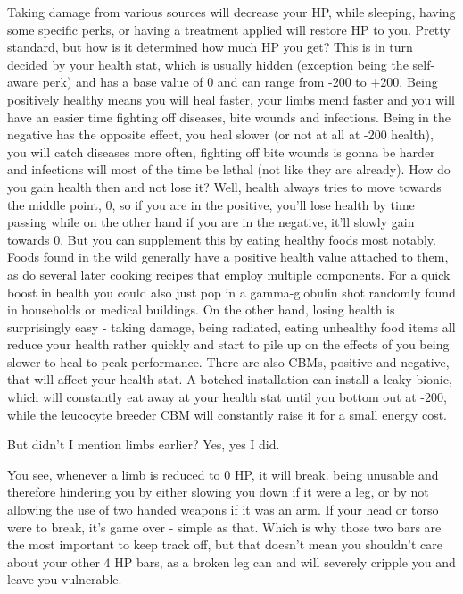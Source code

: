 \documentclass[11pt]{report}
\begin{document}
Taking damage from various sources will decrease your HP, while sleeping, having some specific perks, or having a treatment applied will restore HP to you. Pretty standard, but how is it determined how much HP you get? This is in turn decided by your health stat, which is usually hidden (exception being the self-aware perk) and has a base value of 0 and can range from -200 to +200. Being positively healthy means you will heal faster, your limbs mend faster and you will have an easier time fighting off diseases, bite wounds and infections. Being in the negative has the opposite effect, you heal slower (or not at all at -200 health), you will catch diseases more often, fighting off bite wounds is gonna be harder and infections will most of the time be lethal (not like they are already). How do you gain health then and not lose it? Well, health always tries to move towards the middle point, 0, so if you are in the positive, you'll lose health by time passing while on the other hand if you are in the negative, it'll slowly gain towards 0. But you can supplement this by eating healthy foods most notably. Foods found in the wild generally have a positive health value attached to them, as do several later cooking recipes that employ multiple components. For a quick boost in health you could also just pop in a gamma-globulin shot randomly found in households or medical buildings. On the other hand, losing health is surprisingly easy - taking damage, being radiated, eating unhealthy food items all reduce your health rather quickly and start to pile up on the effects of you being slower to heal to peak performance. There are also CBMs, positive and negative, that will affect your health stat. A botched installation can install a leaky bionic, which will constantly eat away at your health stat until you bottom out at -200, while the leucocyte breeder CBM will constantly raise it for a small energy cost.

But didn't I mention limbs earlier? Yes, yes I did.

You see, whenever a limb is reduced to 0 HP, it will break. being unusable and therefore hindering you by either slowing you down if it were a leg, or by not allowing the use of two handed weapons if it was an arm. If your head or torso were to break, it's game over - simple as that. Which is why those two bars are the most important to keep track off, but that doesn't mean you shouldn't care about your other 4 HP bars, as a broken leg can and will severely cripple you and leave you vulnerable.
\end{document}

